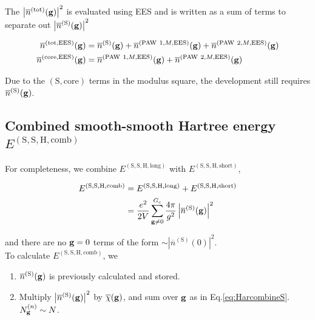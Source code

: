 \documentclass[paper=a4, fontsize=11pt]{article} %
\numberwithin{equation}{section} %
\numberwithin{figure}{section} %
\numberwithin{table}{section} %
\newcommand{\ol}{\overline}
\newcommand{\bg}{{\bf{g}}}
\newcommand{\rS}{{\mathrm{S}}}
\newcommand{\rEES}{{\mathrm{EES}}}
\newcommand{\rcore}{{\mathrm{core}}}
\newcommand{\rshort}{{\mathrm{short}}}
\newcommand{\rlong}{{\mathrm{long}}}
\newcommand{\rP}{{\mathrm{PAW}}}
\newcommand{\rH}{{\mathrm{H}}}
\newcommand{\rcomb}{{\mathrm{comb}}}
\newcommand{\rtot}{{\mathrm{tot}}}
\newcommand{\Ngn}{{N^{(n)}_\bg}}
\newcommand{\Gc}{{G_{\mathrm{c}}}}
\begin{document}
The $\left|\ol n^{(\rtot)}(\bg)\right|^2$ is evaluated using EES and is written as a sum of terms to separate out $\left|\ol n^{(\rS)}(\bg)\right|^2$

\begin{equation}
\begin{split}
\ol{n}^{(\rtot,\rEES)}(\bg) &= \ol n^{(\rS)}(\bg) + \ol n^{(\rP\ 1,M,\rEES)}(\bg)+\ol n^{(\rP\ 2,M,\rEES)}(\bg)\\
\ol{n}^{(\rcore,\rEES)}(\bg) &= \ol n^{(\rP\ 1,M,\rEES)}(\bg)+\ol n^{(\rP\ 2,M,\rEES)}(\bg)\\
\end{split}
\end{equation}

Due to the $(\rS,\rcore)$ terms in the modulus square, the development still requires $\ol n^{(\rS)}(\bg)$.


\subsection{Combined smooth-smooth Hartree energy $E^{(\rS,\rS,\rH,\rcomb)}$}

For completeness, we combine $E^{(\rS,\rS,\rH,\rlong)}$ with $E^{(\rS,\rS,\rH,\rshort)} $,

\begin{equation}
\begin{split}\label{eq:HarcombineS}
E^{(\rS,\rS,\rH,\rcomb)}&=
E^{(\rS,\rS,\rH,\rlong)}+E^{(\rS,\rS,\rH,\rshort)}\\
&= \frac{e^2}{2V} \sum_{\bg \neq 0}^\Gc \frac{4\pi}{g^2}\left|\ol{n}^{(\rS)}(\bg)\right|^2
\end{split}
\end{equation}

and there are no $\bg=0$ terms of the form $\sim \left|\ol n^{(\rS)}(0)\right|^2$.\\


To calculate $E^{(\rS,\rS,\rH,\rcomb)}$, we
\begin{enumerate}
\item $\ol n^{(\rS)}(\bg)$ is previously calculated and stored.
\item Multiply $\left|\ol{n}^{(\rS)}(\bg)\right|^2$ by $\ol \chi(\bg)$, and sum over $\bg$ as in Eq.\eqref{eq:HarcombineS}. $\Ngn \sim N$.
\end{enumerate}
\end{document}
